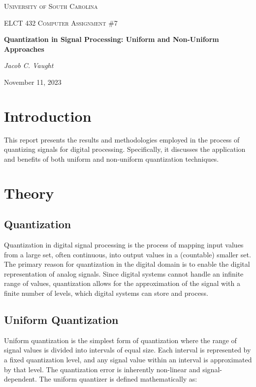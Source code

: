 \documentclass[11pt]{article}
\begin{document}
\begin{titlepage}
    \centering
    {\scshape\LARGE University of South Carolina \par}
    \vspace{1cm}
    {\scshape\Large ELCT 432 Computer Assignment \#7\par}
    \vspace{1.5cm}
    {\huge\bfseries Quantization in Signal Processing: Uniform and Non-Uniform Approaches\par}
    \vspace{2cm}
    {\Large\itshape Jacob C. Vaught\par}
    \vfill
    {\large November 11, 2023\par}
\end{titlepage}

\newpage
\tableofcontents

\newpage
\section{Introduction}
This report presents the results and methodologies employed in the process of quantizing signals for digital processing. Specifically, it discusses the application and benefits of both uniform and non-uniform quantization techniques.

\section{Theory}

\subsection{Quantization}
Quantization in digital signal processing is the process of mapping input values from a large set, often continuous, into output values in a (countable) smaller set. The primary reason for quantization in the digital domain is to enable the digital representation of analog signals. Since digital systems cannot handle an infinite range of values, quantization allows for the approximation of the signal with a finite number of levels, which digital systems can store and process.

\subsection{Uniform Quantization}
Uniform quantization is the simplest form of quantization where the range of signal values is divided into intervals of equal size. Each interval is represented by a fixed quantization level, and any signal value within an interval is approximated by that level. The quantization error is inherently non-linear and signal-dependent. The uniform quantizer is defined mathematically as:
\end{document}
